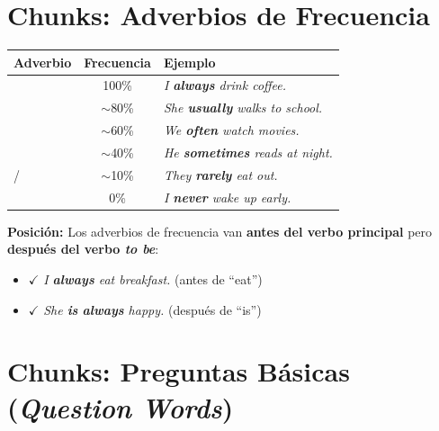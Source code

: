 \documentclass[12pt,a4paper]{article}
\begin{document}
\section{Chunks: Adverbios de Frecuencia}

\begin{cajachunk}

\begin{center}
\begin{tabularx}{0.8\textwidth}{@{} l c X @{}}
\toprule
\textbf{Adverbio} & \textbf{Frecuencia} & \textbf{Ejemplo} \\
\midrule
\eng{always} & 100\% & \textit{I \textbf{always} drink coffee.} \\
\eng{usually} & $\sim$80\% & \textit{She \textbf{usually} walks to school.} \\
\eng{often} & $\sim$60\% & \textit{We \textbf{often} watch movies.} \\
\eng{sometimes} & $\sim$40\% & \textit{He \textbf{sometimes} reads at night.} \\
\eng{rarely} / \eng{seldom} & $\sim$10\% & \textit{They \textbf{rarely} eat out.} \\
\eng{never} & 0\% & \textit{I \textbf{never} wake up early.} \\
\bottomrule
\end{tabularx}
\end{center}

\medskip
\textbf{Posición:} Los adverbios de frecuencia van \textbf{antes del verbo principal} pero \textbf{después del verbo \textit{to be}}:
\begin{itemize}[nosep, leftmargin=1cm]
  \item $\checkmark$ \textit{I \textbf{always} eat breakfast.} (antes de ``eat'')
  \item $\checkmark$ \textit{She \textbf{is} \textbf{always} happy.} (después de ``is'')
\end{itemize}
\end{cajachunk}

\section{Chunks: Preguntas Básicas (\textit{Question Words})}
\end{document}
